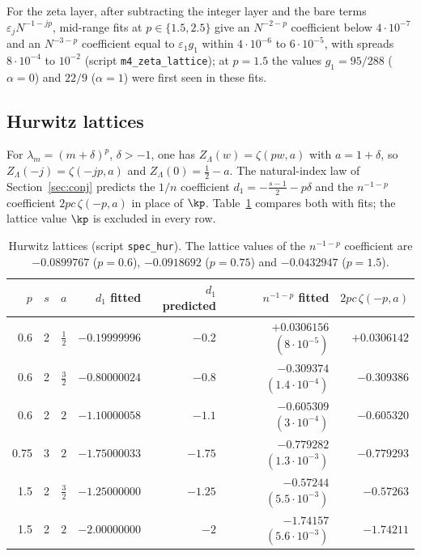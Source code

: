For the zeta layer, after subtracting the integer layer and the bare terms $\varepsilon_jN^{-1-jp}$, mid-range fits at
$p\in\{1.5,2.5\}$ give an $N^{-2-p}$ coefficient below $4\cdot10^{-7}$ and an $N^{-3-p}$ coefficient equal to $\varepsilon_1g_1$
within $4\cdot10^{-6}$ to $6\cdot10^{-5}$, with spreads $8\cdot10^{-4}$ to $10^{-2}$ (script \texttt{m4\_zeta\_lattice}); at
$p=1.5$ the values $g_1=95/288$ ($\alpha=0$) and $22/9$ ($\alpha=1$) were first seen in these fits.

\subsection{Hurwitz lattices}\label{sec:hurwitz}
For $\lambda_m=(m+\delta)^p$, $\delta>-1$, one has $Z_\Lambda(w)=\zeta(pw,a)$ with $a=1+\delta$, so $Z_\Lambda(-j)=\zeta(-jp,a)$ and
$Z_\Lambda(0)=\frac12-a$. The natural-index law of Section~\ref{sec:conj} predicts the $1/n$ coefficient
$d_1=-\frac{s-1}2-p\delta$ and the $n^{-1-p}$ coefficient $2pc\,\zeta(-p,a)$ in place of $\kp$. Table~\ref{tab:hurwitz}
compares both with fits; the lattice value $\kp$ is excluded in every row.

\begin{table}[ht]
\centering
\small
\begin{tabular}{rrrrrrr}
\toprule
$p$ & $s$ & $a$ & $d_1$ fitted & $d_1$ predicted & $n^{-1-p}$ fitted & $2pc\,\zeta(-p,a)$\\
\midrule
0.6 & 2 & $\frac12$ & $-0.19999996$ & $-0.2$ & $+0.0306156$ $(8\cdot10^{-5})$ & $+0.0306142$\\
0.6 & 2 & $\frac32$ & $-0.80000024$ & $-0.8$ & $-0.309374$ $(1.4\cdot10^{-4})$ & $-0.309386$\\
0.6 & 2 & $2$ & $-1.10000058$ & $-1.1$ & $-0.605309$ $(3\cdot10^{-4})$ & $-0.605320$\\
0.75 & 3 & $2$ & $-1.75000033$ & $-1.75$ & $-0.779282$ $(1.3\cdot10^{-3})$ & $-0.779293$\\
1.5 & 2 & $\frac32$ & $-1.25000000$ & $-1.25$ & $-0.57244$ $(5.5\cdot10^{-3})$ & $-0.57263$\\
1.5 & 2 & $2$ & $-2.00000000$ & $-2$ & $-1.74157$ $(5.6\cdot10^{-3})$ & $-1.74211$\\
\bottomrule
\end{tabular}
\caption{Hurwitz lattices (script \texttt{spec\_hur}). The lattice values of the $n^{-1-p}$ coefficient are $-0.0899767$
($p=0.6$), $-0.0918692$ ($p=0.75$) and $-0.0432947$ ($p=1.5$).}
\label{tab:hurwitz}
\end{table}

